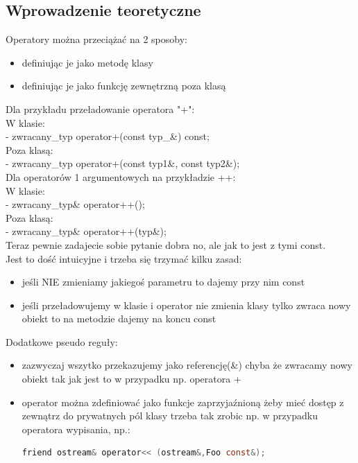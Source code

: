 \subsection{Wprowadzenie teoretyczne}

Operatory można przeciążać na 2 sposoby:
\begin{itemize}
	\item definiując je jako metodę klasy
	\item definiując je jako funkcję zewnętrzną poza klasą
\end{itemize}
	
Dla przykładu przeładowanie operatora "+":\\
W klasie:\\
- zwracany\_typ operator+(const typ\_\&) const;\\
Poza klasą:\\
- zwracany\_typ operator+(const typ1\&, const typ2\&);\\

Dla operatorów 1 argumentowych na przykładzie ++:\\
W klasie:\\
- zwracany\_typ\& operator++();\\
Poza klasą:\\
- zwracany\_typ\& operator++(typ\&);\\

Teraz pewnie zadajecie sobie pytanie dobra no, ale jak to jest z tymi const. \\
Jest to dość intuicyjne i trzeba się trzymać kilku zasad:
\begin{itemize}
	\item jeśli NIE zmieniamy jakiegoś parametru to dajemy przy nim const
	\item jeśli przeładowujemy w klasie i operator nie zmienia klasy tylko zwraca nowy obiekt to na metodzie dajemy na koncu const
\end{itemize}

Dodatkowe pseudo reguły:
\begin{itemize}
	\item zazwyczaj wszytko przekazujemy jako referencję(\&) chyba że zwracamy nowy obiekt tak jak jest to w przypadku np. operatora +
	\item operator można zdefiniować jako funkcje zaprzyjaźnioną żeby mieć dostęp z zewnątrz do prywatnych pól klasy trzeba tak zrobic np. w przypadku operatora wypisania, np.:
		\begin{lstlisting}[language=c]
	friend ostream& operator<< (ostream&,Foo const&);
		\end{lstlisting}
	\end{itemize}
	
